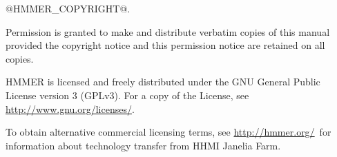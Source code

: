 \vspace*{\fill}
\begin{flushleft}
@HMMER_COPYRIGHT@.\vspace{5mm}

\vspace{5mm}
Permission is granted to make and distribute verbatim copies of this
manual provided the copyright notice and this permission notice are
retained on all copies.\vspace{5mm}

\vspace{5mm} HMMER is licensed and freely distributed under the GNU
General Public License version 3 (GPLv3). For a copy of the License,
see \url{http://www.gnu.org/licenses/}.

\vspace{5mm}

To obtain alternative commercial licensing terms, see
\url{http://hmmer.org/}\ for information about technology transfer
from HHMI Janelia Farm.

\vspace{5mm}
\end{flushleft}



